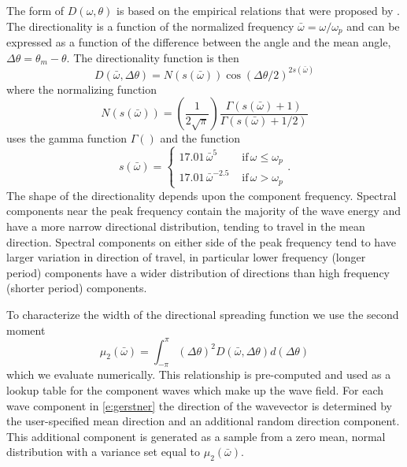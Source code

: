 \documentclass[utf8]{frontiersSCNS} %
\begin{document}
The form of $D(\omega,\theta)$ is based on the empirical relations that were proposed by \citet{mitsuyasu75observations}.  The directionality is a function of the normalized frequency $\bar{\omega}=\omega/\omega_p$ and can be expressed as a function of the difference between the angle and the mean angle, $\Delta\theta = \theta_m-\theta$.  The directionality function is then
\begin{equation}
D(\bar{\omega},\Delta\theta) = N(s(\bar{\omega})) \cos{(\Delta\theta/2)}^{2s(\bar{\omega})}
\end{equation}
where the normalizing function
\begin{equation}
N(s(\bar{\omega})) = \left(\frac{1}{2\sqrt{\pi}}\right) \frac{\Gamma(s(\bar{\omega})+1)}{\Gamma(s(\bar{\omega})+1/2)}
\end{equation}
uses the gamma function $\Gamma()$ and the function
\begin{equation}
s(\bar{\omega}) = \left\{
\begin{array}{ll}
  17.01 \, \bar{\omega}^5 \,\, & \mathrm{if} \, \omega \leq \omega_p \\
  17.01 \, \bar{\omega}^{-2.5}  \,\, & \mathrm{if} \, \omega > \omega_p
\end{array}
\right. .
\end{equation}
The shape of the directionality depends upon the component frequency. Spectral components near the peak frequency contain the majority of the wave energy and have a more narrow directional distribution, tending to travel in the mean direction.  Spectral components on either side of the peak frequency tend to have larger variation in direction of travel, in particular lower frequency (longer period) components have a wider distribution of directions than high frequency (shorter period) components.  

To characterize the width of the directional spreading function we use the second moment
\begin{equation}
\mu_2(\bar{\omega}) = \int_{-\pi}^{\pi}(\Delta\theta)^2 D(\bar{\omega},\Delta\theta) d(\Delta\theta)
\end{equation}
which we evaluate numerically. This relationship is pre-computed and used as a lookup table for the component waves which make up the wave field.  For each wave component in \eqref{e:gerstner} the direction of the wavevector is determined by the user-specified mean direction and an additional random direction component.  This additional component is generated as a sample from a zero mean, normal distribution with a variance set equal to $\mu_2(\bar{\omega})$.  
\end{document}

